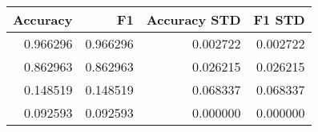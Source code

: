 \begin{tabular}{rrrr}
\toprule
Accuracy & F1 & Accuracy STD & F1 STD \\
\midrule
0.966296 & 0.966296 & 0.002722 & 0.002722 \\
0.862963 & 0.862963 & 0.026215 & 0.026215 \\
0.148519 & 0.148519 & 0.068337 & 0.068337 \\
0.092593 & 0.092593 & 0.000000 & 0.000000 \\
\bottomrule
\end{tabular}

